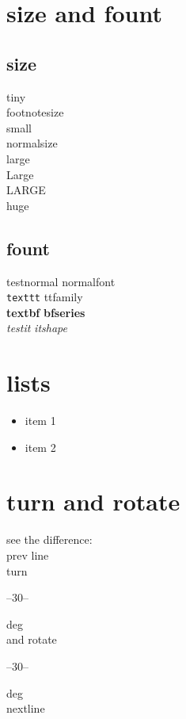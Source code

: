 \documentclass[11pt,a4paper]{article}
\begin{document}
\section{size and fount}{
  \subsection{size}{
    \tiny tiny\\
    \footnotesize{footnotesize}\\ 
    {\small small}\\
    \normalsize normalsize\\
    \large large\\
    \Large Large\\
    \LARGE LARGE\\
    \huge huge
  }
  \subsection{fount}{
    \textnormal{testnormal} {\normalfont normalfont}\\
    \texttt{texttt} {\ttfamily ttfamily}\\
    \textbf{textbf} {\bfseries bfseries}\\
    \textit{testit} {\itshape itshape}
  }
}

\section{lists}{
  \begin{itemize}
  \item item 1
  \item item 2
  \end{itemize}
}

\section{turn and rotate}{
  see the difference:\\
  prev line\\
  turn
  \begin{turn}{30}
    --30--
  \end{turn}
  deg\\
  and rotate
  \begin{rotate}{30}
    --30--
  \end{rotate}
  deg\\
  nextline
}
\end{document}

